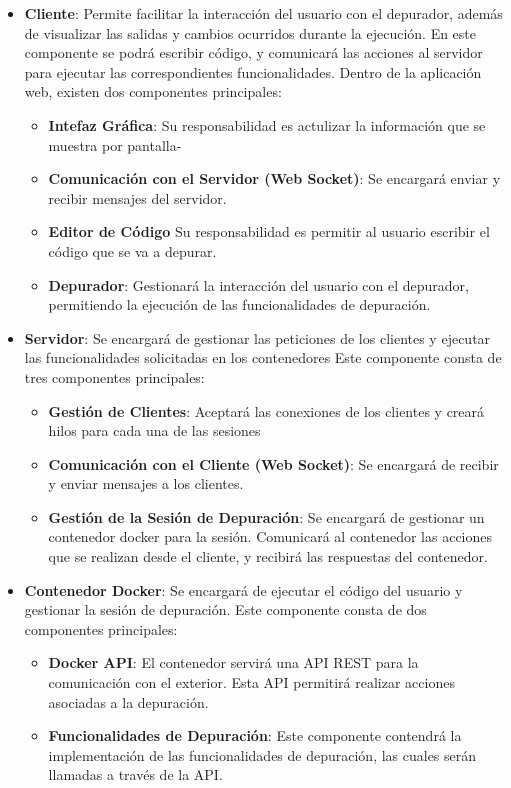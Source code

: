 \begin{itemize}
    \item \textbf{Cliente}: Permite facilitar la interacción del usuario con el depurador, además de visualizar las salidas y cambios ocurridos durante la ejecución. En este componente se podrá escribir código, y comunicará las acciones al servidor para ejecutar las correspondientes funcionalidades. 
    Dentro de la aplicación web, existen dos componentes principales:

    \begin{itemize}
        \item \textbf{Intefaz Gráfica}: Su responsabilidad es actulizar la información que se muestra por pantalla-
        \item \textbf{Comunicación con el Servidor (Web Socket)}: Se encargará enviar y recibir mensajes del servidor.
        \item \textbf{Editor de Código} Su responsabilidad es permitir al usuario escribir el código que se va a depurar.
        \item \textbf{Depurador}: Gestionará la interacción del usuario con el depurador, permitiendo la ejecución de las funcionalidades de depuración.
    \end{itemize}

    \item \textbf{Servidor}: Se encargará de gestionar las peticiones de los clientes y ejecutar las funcionalidades solicitadas en los contenedores
    Este componente consta de tres componentes principales:
    \begin{itemize}
        \item \textbf{Gestión de Clientes}: Aceptará las conexiones de los clientes y creará hilos para cada una de las sesiones
        \item \textbf{Comunicación con el Cliente (Web Socket)}: Se encargará de recibir y enviar mensajes a los clientes. 
        \item \textbf{Gestión de la Sesión de Depuración}: Se encargará de gestionar un contenedor docker para la sesión. Comunicará al contenedor las acciones que se realizan desde el cliente, y recibirá las respuestas del contenedor. 
    \end{itemize}

    \item \textbf{Contenedor Docker}: Se encargará de ejecutar el código del usuario y gestionar la sesión de depuración. Este componente consta de dos componentes principales:
    \begin{itemize}
        \item \textbf{Docker API}: El contenedor servirá una API REST para la comunicación con el exterior. Esta API permitirá realizar acciones asociadas a la depuración.
        \item \textbf{Funcionalidades de Depuración}: Este componente contendrá la implementación de las funcionalidades de depuración, las cuales serán llamadas a través de la API.
    \end{itemize}
\end{itemize}

